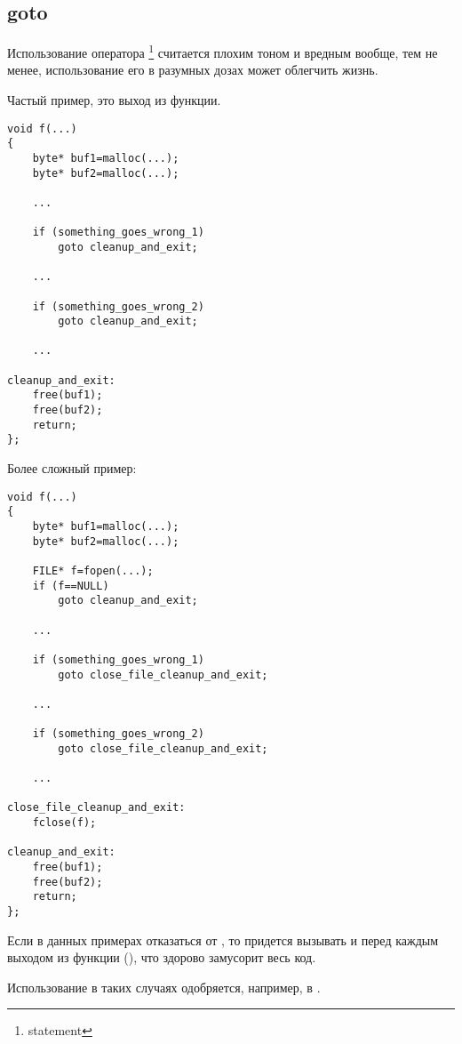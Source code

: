 ﻿\subsection{goto}

Использование оператора \footnote{statement} считается плохим тоном и вредным вообще\cite{Dijkstra:1968:LEG:362929.362947}\cite{Dijkstra:1979:GSC:1241515.1241518}, 
тем не менее, использование его в разумных дозах\cite{Knuth:1974:SPG:356635.356640} может облегчить жизнь.

Частый пример, это выход из функции.

\begin{lstlisting}
void f(...)
{
	byte* buf1=malloc(...);
	byte* buf2=malloc(...);

	...

	if (something_goes_wrong_1)
		goto cleanup_and_exit;

	...
	
	if (something_goes_wrong_2)
		goto cleanup_and_exit;

	...

cleanup_and_exit:
	free(buf1);
	free(buf2);
	return;
};
\end{lstlisting}

Более сложный пример:

\begin{lstlisting}
void f(...)
{
	byte* buf1=malloc(...);
	byte* buf2=malloc(...);

	FILE* f=fopen(...);
	if (f==NULL)
		goto cleanup_and_exit;

	...

	if (something_goes_wrong_1)
		goto close_file_cleanup_and_exit;

	...
	
	if (something_goes_wrong_2)
		goto close_file_cleanup_and_exit;

	...

close_file_cleanup_and_exit:
	fclose(f);

cleanup_and_exit:
	free(buf1);
	free(buf2);
	return;
};
\end{lstlisting}

Если в данных примерах отказаться от , то придется вызывать  и 
перед каждым выходом из функции (), что здорово замусорит весь код.

Использование  в таких случаях одобряется, например, в \cite{LinuxKernelCodingStyle}.

